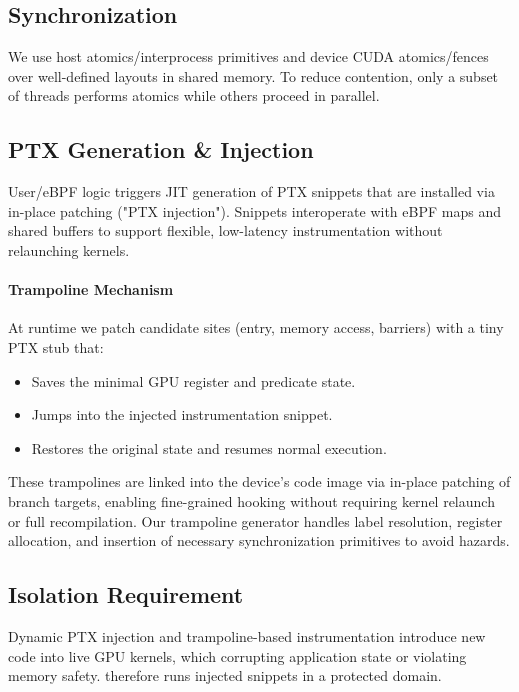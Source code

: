 \subsection{Synchronization}
We use host atomics/interprocess primitives and device CUDA atomics/fences over well-defined layouts in shared memory. To reduce contention, only a subset of threads performs atomics while others proceed in parallel.

\subsection{PTX Generation \& Injection}\label{sec:ptx_injection}

User/eBPF logic triggers JIT generation of PTX snippets that are installed via in-place patching ("PTX injection"). Snippets interoperate with eBPF maps and shared buffers to support flexible, low-latency instrumentation without relaunching kernels.

\paragraph{Trampoline Mechanism}
At runtime we patch candidate sites (entry, memory access, barriers) with a tiny PTX stub that:
\begin{itemize}[leftmargin=*,itemsep=0pt]
  \item Saves the minimal GPU register and predicate state.
  \item Jumps into the injected instrumentation snippet.
  \item Restores the original state and resumes normal execution.
\end{itemize}
These trampolines are linked into the device's code image via in-place patching of branch targets, enabling fine-grained hooking without requiring kernel relaunch or full recompilation. Our trampoline generator handles label resolution, register allocation, and insertion of necessary synchronization primitives to avoid hazards.



\subsection{Isolation Requirement}\label{sec:isolation}

Dynamic PTX injection and trampoline-based instrumentation introduce new code into live GPU kernels, which  corrupting application state or violating memory safety. \sys therefore runs injected snippets in a protected domain.

